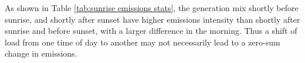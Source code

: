 As shown in Table \ref{tab:sunrise emissions stats}, the generation mix shortly before sunrise, and shortly after sunset have higher emissions intensity than shortly after sunrise and before sunset, with a larger difference in the morning. Thus a shift of load from one time of day to another may not necessarily lead to a zero-sum change in emissions.


